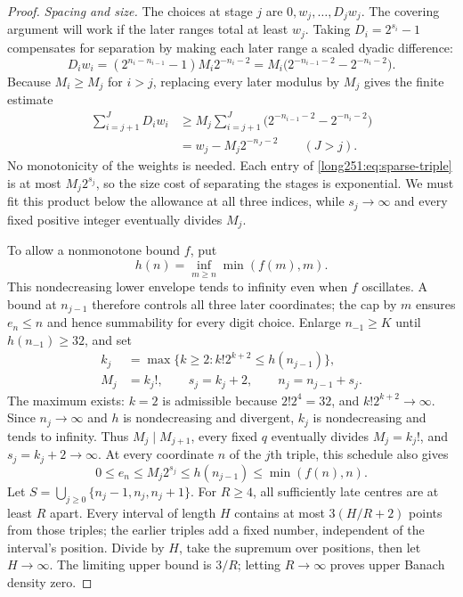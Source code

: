 \documentclass[11pt]{article}
\begin{document}
\begin{proof}
\par\medskip\noindent\emph{Spacing and size.}
The choices at stage $j$ are $0,w_j,\ldots,D_jw_j$.
The covering argument will work if the later ranges total at least
$w_j$.  Taking $D_i=2^{s_i}-1$ compensates for separation by making
each later range a scaled dyadic difference:
\[
 D_iw_i=(2^{n_i-n_{i-1}}-1)M_i2^{-n_i-2}
       =M_i\bigl(2^{-n_{i-1}-2}-2^{-n_i-2}\bigr).
\]
Because $M_i\ge M_j$ for $i>j$, replacing every later modulus by $M_j$
gives the finite estimate
\begin{equation}\label{long251:eq:finite-overlap}
 \begin{aligned}
 \sum_{i=j+1}^{J}D_iw_i
 &\ge M_j\sum_{i=j+1}^{J}
       \bigl(2^{-n_{i-1}-2}-2^{-n_i-2}\bigr)\\
 &=w_j-M_j2^{-n_J-2}\qquad(J>j).
 \end{aligned}
\end{equation}
No monotonicity of the weights is needed.  Each entry of
\eqref{long251:eq:sparse-triple} is at most $M_j2^{s_j}$, so the size cost of
separating the stages is exponential.  We must fit this product below
the allowance at all three indices, while $s_j\to\infty$ and every
fixed positive integer eventually divides $M_j$.

To allow a nonmonotone bound $f$, put
\[
 h(n)=\inf_{m\ge n}\min(f(m),m).
\]
This nondecreasing lower envelope tends to infinity even when $f$
oscillates.  A bound at $n_{j-1}$ therefore controls all three later
coordinates; the cap by $m$ ensures $e_n\le n$ and hence summability
for every digit choice.
Enlarge $n_{-1}\ge K$ until $h(n_{-1})\ge32$, and set
\begin{equation}\label{long251:eq:sparse-general-schedule}
 \begin{split}
 k_j&=\max\{k\ge2:k!2^{k+2}\le h(n_{j-1})\},\\
 M_j&=k_j!,\qquad s_j=k_j+2,\qquad n_j=n_{j-1}+s_j.
 \end{split}
\end{equation}
The maximum exists: $k=2$ is admissible because $2!2^4=32$, and
$k!2^{k+2}\to\infty$.  Since $n_j\to\infty$ and $h$ is nondecreasing
and divergent, $k_j$ is nondecreasing and tends to infinity.  Thus
$M_j\mid M_{j+1}$, every fixed $q$ eventually divides $M_j=k_j!$,
and $s_j=k_j+2\to\infty$.
At every coordinate $n$ of the $j$th triple, this schedule also gives
\[
 0\le e_n\le M_j2^{s_j}\le h(n_{j-1})\le\min(f(n),n).
\]
Let $S=\bigcup_{j\ge0}\{n_j-1,n_j,n_j+1\}$.  For $R\ge4$, all
sufficiently late centres are at least $R$ apart.  Every interval of
length $H$ contains at most $3(H/R+2)$ points from those triples;
the earlier triples add a fixed number, independent of the interval's
position.  Divide by $H$, take the supremum over positions, then let
$H\to\infty$.  The limiting upper bound is $3/R$; letting $R\to\infty$
proves upper Banach density zero.


\end{proof}
\end{document}
